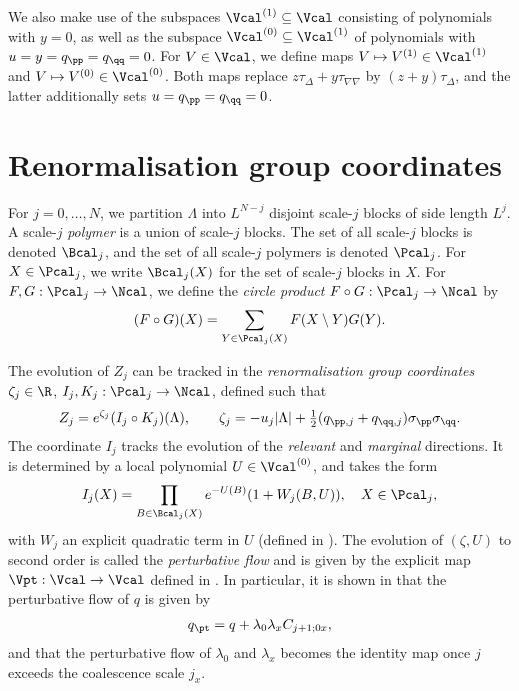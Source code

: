 We also make use of the subspaces $\Vcal^{(1)} \subseteq \Vcal$ consisting of polynomials with $y = 0$, as well as the subspace
$\Vcal^{(0)} \subseteq \Vcal^{(1)}$ of polynomials with
$u = y =   q_\pp=q_\qq = 0$.
For $V \in \Vcal$, we define maps $V \mapsto V^{(1)} \in \Vcal^{(1)}$
and $V \mapsto V^{(0)} \in \Vcal^{(0)}$. Both maps replace
$z\tau_{\Delta}+y\tau_{\nabla\nabla}$ by
$(z+y)\tau_{\Delta}$, and the latter
additionally sets
$u = q_\pp = q_\qq = 0$.


\section{Renormalisation group coordinates}
\label{sec:rgcoord}

For $j=0,\ldots, N$,
we partition $\Lambda$ into $L^{N-j}$ disjoint scale-$j$ blocks of side length $L^j$.
A scale-$j$ \emph{polymer} is a union of scale-$j$ blocks.
The set of all scale-$j$ blocks is denoted $\Bcal_j$, and
the set of all scale-$j$ polymers is denoted $\Pcal_j$.
For $X \in \Pcal_j$, we write $\Bcal_j(X)$ for the set of scale-$j$ blocks in $X$.
For $F, G : \Pcal_j \to \Ncal$, we define the \emph{circle product} $F \circ G : \Pcal_j \to \Ncal$ by
\begin{equation}
(F \circ G)(X) = \sum_{Y\in\Pcal_j(X)} F(X \setminus Y) G(Y).
\end{equation}

The evolution of $Z_j$ can be tracked in the \emph{renormalisation group coordinates}
$\zeta_j \in \R$,
$I_j, K_j : \Pcal_j \to \Ncal$, defined such that
\begin{equation}
\label{e:IcircKnew}
    Z_j = e^{\zeta_j}(I_j\circ K_j)(\Lambda),
    \qquad
    \zeta_j= - u_j|\Lambda|
    + \textstyle{\frac 12} (q_{\pp,j} + q_{\qq,j}) \sigma_\pp\sigma_\qq
    .
\end{equation}
The coordinate $I_j$ tracks the evolution of the
\emph{relevant} and \emph{marginal} directions.  It
is determined by a local polynomial
$U\in \Vcal^{(0)}$,
and takes the form
\begin{equation}
I_j(X) = \prod_{B \in \Bcal_j(X)} e^{-U(B)} (1 + W_j(B, U)), \quad X \in \Pcal_j,
\end{equation}
with $W_j$ an explicit quadratic term in $U$ (defined in \cite[\eqref{pt-e:WLTF}]{BBS-rg-pt}).
The evolution of $(\zeta, U)$ to second order is called the \emph{perturbative flow} and is
given by the explicit map $\Vpt : \Vcal \to \Vcal$ defined in
\cite[\eqref{pt-e:Vptdef}]{BBS-rg-pt}.
In particular, it is shown in \cite[Proposition~\ref{phi4-prop:pt}]{ST-phi4}
that the perturbative flow of $q$ is given by
\begin{align}
\label{e:qpt}
q_\pt = q + \lambda_0 \lambda_x C_{j+1;0x},
\end{align}
and that the perturbative flow of $\lambda_0$ and $\lambda_x$ becomes the identity map
once $j$ exceeds the coalescence scale $j_x$.

